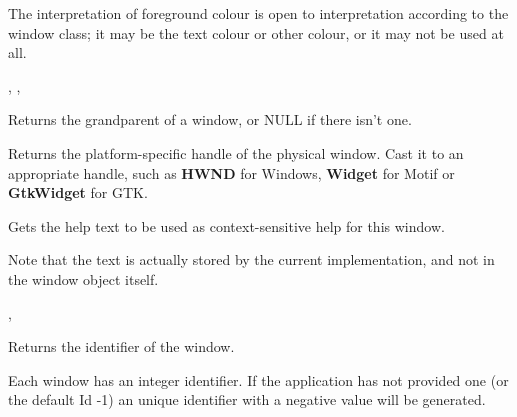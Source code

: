 The interpretation of foreground colour is open to interpretation according
to the window class; it may be the text colour or other colour, or it may not
be used at all.


,\rtfsp
{},\rtfsp
{}



Returns the grandparent of a window, or NULL if there isn't one.

\label{wxwindowgethandle}


Returns the platform-specific handle of the physical window. Cast it to an appropriate
handle, such as {\bf HWND} for Windows, {\bf Widget} for Motif or {\bf GtkWidget} for GTK.



\label{wxwindowgethelptext}


Gets the help text to be used as context-sensitive help for this window.

Note that the text is actually stored by the current  implementation,
and not in the window object itself.


, 

\label{wxwindowgetid}


Returns the identifier of the window.


Each window has an integer identifier. If the application has not provided one
(or the default Id -1) an unique identifier with a negative value will be generated.

